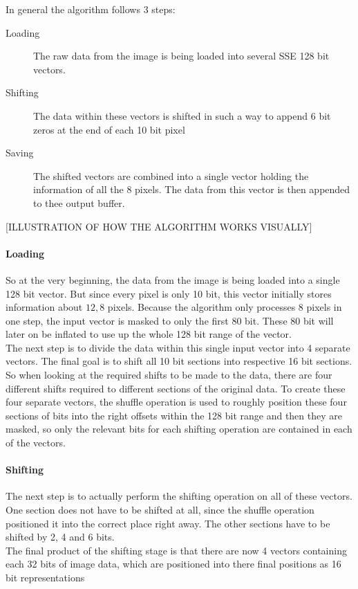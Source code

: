 In general the algorithm follows 3 steps:
\begin{description}
\item[Loading] The raw data from the image is being loaded into several SSE 128 bit vectors.
\item[Shifting] The data within these vectors is shifted in such a way to append 6 bit zeros at the end of each 10 bit pixel
\item[Saving] The shifted vectors are combined into a single vector holding the information of all the 8 pixels. The data from this vector is then appended to thee output buffer.
\end{description}

[ILLUSTRATION OF HOW THE ALGORITHM WORKS VISUALLY]

\paragraph{Loading}

So at the very beginning, the data from the image is being loaded into a single 128 bit vector. But since every pixel is only 10 bit, this vector initially stores information about $12,8$ pixels. Because the algorithm only processes 8 pixels in one step, the input vector is masked to only the first 80 bit. These 80 bit will later on be inflated to use up the whole 128 bit range of the vector.\\
The next step is to divide the data within this single input vector into 4 separate vectors. The final goal is to shift all 10 bit sections into respective 16 bit sections. So when looking at the required shifts to be made to the data, there are four different shifts required to different sections of the original data. To create these four separate vectors, the shuffle operation is used to roughly position these four sections of bits into the right offsets within the 128 bit range and then they are masked, so only the relevant bits for each shifting operation are contained in each of the vectors.

\paragraph{Shifting}

The next step is to actually perform the shifting operation on all of these vectors. One section does not have to be shifted at all, since the shuffle operation positioned it into the correct place right away. The other sections have to be shifted by 2, 4 and 6 bits.\\
The final product of the shifting stage is that there are now 4 vectors containing each 32 bits of image data, which are positioned into there final positions as 16 bit representations

